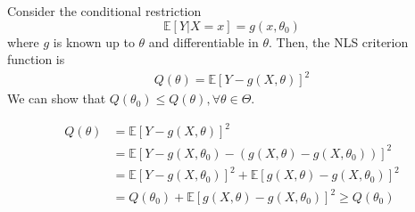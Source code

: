 \documentclass[11pt]{elegantbook}
\begin{document}
\begin{example}
    Consider the conditional restriction $$\mathbb{E}[Y|X=x]=g(x,\theta_0)$$
    where $g$ is known up to $\theta$ and differentiable in $\theta$. Then, the NLS criterion function is
    \begin{equation}
        \begin{aligned}
            Q(\theta)=\mathbb{E}[Y-g(X,\theta)]^2
        \end{aligned}
        \nonumber
    \end{equation}
    We can show that $Q(\theta_0)\leq Q(\theta), \forall \theta\in \Theta$.
    \begin{lemma}
        \begin{equation}
            \begin{aligned}
                Q(\theta)&=\mathbb{E}[Y-g(X,\theta)]^2\\
                &=\mathbb{E}[Y-g(X,\theta_0)-(g(X,\theta)-g(X,\theta_0))]^2\\
                &=\mathbb{E}[Y-g(X,\theta_0)]^2+\mathbb{E}[g(X,\theta)-g(X,\theta_0)]^2\\
                &=Q(\theta_0)+\mathbb{E}[g(X,\theta)-g(X,\theta_0)]^2\geq Q(\theta_0)
            \end{aligned}
            \nonumber
        \end{equation}
    \end{lemma}
\end{example}
\end{document}
